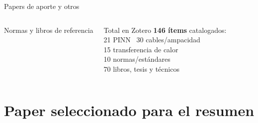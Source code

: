 \documentclass[aspectratio=169]{beamer}
\begin{document}
\begin{frame}{Papers de aporte y otros}
\begin{columns}[T]
\begin{exampleblock}{\small Normas y libros de referencia}
\begin{itemize}
        \end{itemize}
      \end{exampleblock}
      \vspace{0.2em}
      \begin{alertblock}{\small Total en Zotero}
        \tiny
        \textbf{146 ítems} catalogados:\\[-2pt]
        21 PINN \textbullet\ 30 cables/ampacidad\\[-2pt]
        15 transferencia de calor\\[-2pt]
        10 normas/estándares\\[-2pt]
        70 libros, tesis y técnicos
      \end{alertblock}
  \end{columns}
\end{frame}

\section{Paper seleccionado para el resumen}
\end{document}
